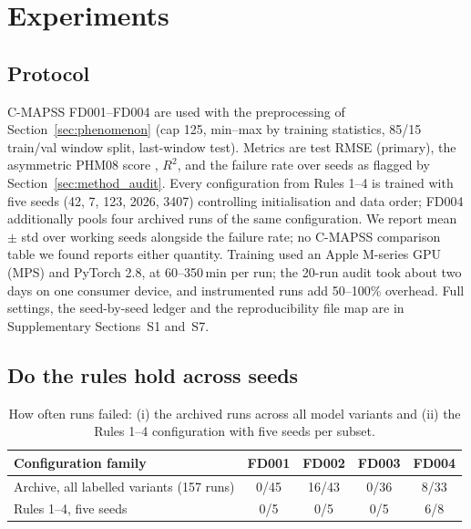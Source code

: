 \section{Experiments}
\label{sec:experiments}

\subsection{Protocol}

C-MAPSS FD001--FD004 are used with the preprocessing of
Section~\ref{sec:phenomenon} (cap 125, min--max by training statistics,
85/15 train/val window split, last-window test). Metrics are test RMSE
(primary), the asymmetric PHM08 score \cite{saxena2008damage}, $R^2$, and
the failure rate over seeds as flagged by Section~\ref{sec:method_audit}.
Every configuration from Rules 1--4 is trained with five seeds (42, 7, 123,
2026, 3407) controlling initialisation and data order; FD004 additionally
pools four archived runs of the same configuration. We report mean $\pm$ std
over working seeds alongside the failure rate; no C-MAPSS comparison table
we found reports either quantity. Training used an Apple M-series GPU (MPS)
and PyTorch 2.8, at 60--350\,min per run; the 20-run audit took about two
days on one consumer device, and instrumented runs add 50--100\% overhead.
Full settings, the seed-by-seed ledger and the reproducibility file map are
in Supplementary Sections~S1 and~S7.

\subsection{Do the rules hold across seeds}

\begin{table}[t]
\centering\footnotesize
\caption{How often runs failed: (i) the archived runs across all model
variants and (ii) the Rules 1--4 configuration with five seeds per subset.}
\label{tab:audit}
\begin{tabularx}{\linewidth}{Xcccc}
\toprule
Configuration family & FD001 & FD002 & FD003 & FD004 \\
\midrule
Archive, all labelled variants (157 runs) & 0/45 & 16/43 & 0/36 & 8/33 \\
Rules 1--4, five seeds & 0/5 & 0/5 & 0/5 & 6/8 \\
\bottomrule
\end{tabularx}
\end{table}

